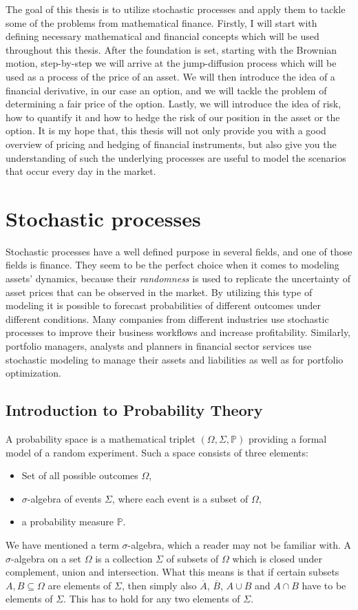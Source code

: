 \documentclass[times, utf8, diplomski]{fer}
\begin{document}
The goal of this thesis is to utilize stochastic processes and apply them to tackle some of the problems from mathematical finance. Firstly, I will start with defining necessary mathematical and financial concepts which will be used throughout this thesis. After the foundation is set, starting with the Brownian motion, step-by-step we will arrive at the jump-diffusion process which will be used as a process of the price of an asset. We will then introduce the idea of a financial derivative, in our case an option, and we will tackle the problem of determining a fair price of the option. Lastly, we will introduce the idea of risk, how to quantify it and how to hedge the risk of our position in the asset or the option. It is my hope that, this thesis will not only provide you with a good overview of pricing and hedging of financial instruments, but also give you the understanding of such the underlying processes are useful to model the scenarios that occur every day in the market.

\chapter{Stochastic processes}
Stochastic processes have a well defined purpose in several fields, and one of those fields is finance. They seem to be the perfect choice when it comes to modeling assets' dynamics, because their \textit{randomness} is used to replicate the uncertainty of asset prices that can be observed in the market. By utilizing this type of modeling it is possible to forecast probabilities of different outcomes under different conditions. Many companies from different industries use stochastic processes to improve their business workflows and increase profitability. Similarly, portfolio managers, analysts and planners in financial sector services use stochastic modeling to manage their assets and liabilities as well as for portfolio optimization. \\
\section{Introduction to Probability Theory}
A probability space is a mathematical triplet $(\Omega, \Sigma, \mathbb{P})$ providing a formal model of a random experiment. Such a space consists of three elements:
\begin{itemize}
	\item Set of all possible outcomes $\Omega$,
	\item $\sigma$-algebra of events $\Sigma$, where each event is a subset of $\Omega$,
	\item a probability measure $\mathbb{P}$.
\end{itemize}
We have mentioned a term $\sigma$-algebra, which a reader may not be familiar with. A $\sigma$-algebra on a set $\Omega$ is a collection $\Sigma$ of subsets of $\Omega$ which is closed under complement, union and intersection. What this means is that if certain subsets $A,B\subseteq\Omega$ are elements of $\Sigma$, then simply also $\overline{A}$, $\overline{B}$, $A\cup B$ and $A\cap B$ have to be elements of $\Sigma$. This has to hold for any two elements of $\Sigma$.
\end{document}
